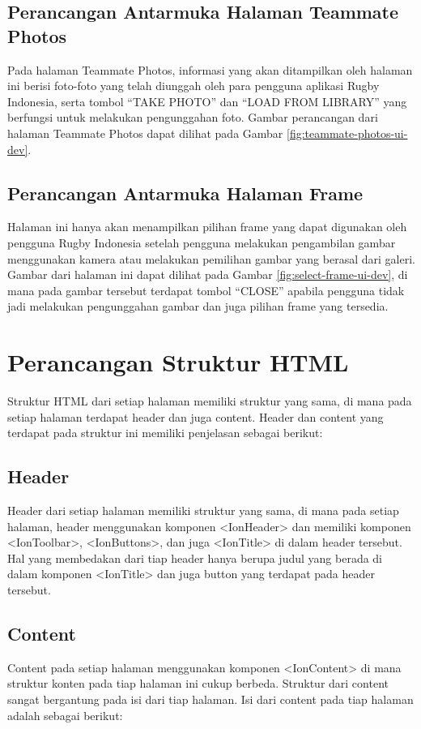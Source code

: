 \subsection{Perancangan Antarmuka Halaman Teammate Photos}

Pada halaman Teammate Photos, informasi yang akan ditampilkan oleh halaman ini berisi foto-foto yang telah diunggah oleh para pengguna aplikasi Rugby Indonesia, serta tombol ``TAKE PHOTO'' dan ``LOAD FROM LIBRARY'' yang berfungsi untuk melakukan pengunggahan foto. Gambar perancangan dari halaman Teammate Photos dapat dilihat pada Gambar \ref{fig:teammate-photos-ui-dev}.

\subsection{Perancangan Antarmuka Halaman Frame}

Halaman ini hanya akan menampilkan pilihan frame yang dapat digunakan oleh pengguna Rugby Indonesia setelah pengguna melakukan pengambilan gambar menggunakan kamera atau melakukan pemilihan gambar yang berasal dari galeri. Gambar dari halaman ini dapat dilihat pada Gambar \ref{fig:select-frame-ui-dev}, di mana pada gambar tersebut terdapat tombol ``CLOSE'' apabila pengguna tidak jadi melakukan pengunggahan gambar dan juga pilihan frame yang tersedia.

\section{Perancangan Struktur HTML}
Struktur HTML dari setiap halaman memiliki struktur yang sama, di mana pada setiap halaman terdapat header dan juga content. Header dan content yang terdapat pada struktur ini memiliki penjelasan sebagai berikut:

\subsection{Header}
Header dari setiap halaman memiliki struktur yang sama, di mana pada setiap halaman, header menggunakan komponen <IonHeader> dan memiliki komponen <IonToolbar>, <IonButtons>, dan juga <IonTitle> di dalam header tersebut. Hal yang membedakan dari tiap header hanya berupa judul yang berada di dalam komponen <IonTitle> dan juga button yang terdapat pada header tersebut.

\subsection{Content}
Content pada setiap halaman menggunakan komponen <IonContent> di mana struktur konten pada tiap halaman ini cukup berbeda. Struktur dari content sangat bergantung pada isi dari tiap halaman. Isi dari content pada tiap halaman adalah sebagai berikut:


